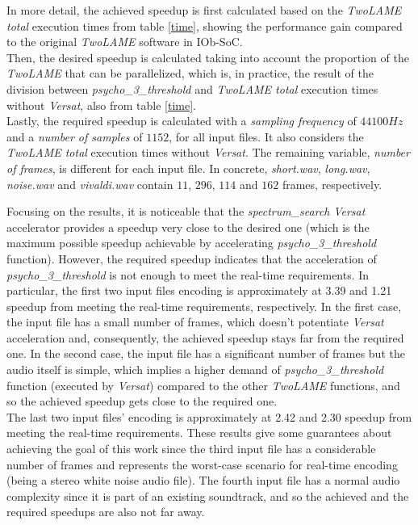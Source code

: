 
In more detail, the achieved speedup is first calculated based on the \textit{TwoLAME total} execution times from table \ref{time}, showing the performance gain compared to the original \textit{TwoLAME} software in IOb-SoC.\\
Then, the desired speedup is calculated taking into account the proportion of the \textit{TwoLAME} that can be parallelized, which is, in practice, the result of the division between \textit{psycho\_3\_threshold} and \textit{TwoLAME total} execution times without \textit{Versat}, also from table \ref{time}. \\
Lastly, the required speedup is calculated with a \textit{sampling frequency} of $44100Hz$ and a \textit{number of samples} of $1152$, for all input files. It also considers the \textit{TwoLAME total} execution times without \textit{Versat}. The remaining variable, \textit{number of frames}, is different for each input file. In concrete, \textit{short.wav}, \textit{long.wav}, \textit{noise.wav} and \textit{vivaldi.wav} contain $11$, $296$, $114$ and $162$ frames, respectively.

Focusing on the results, it is noticeable that the \textit{spectrum\_search} \textit{Versat} accelerator provides a speedup very close to the desired one (which is the maximum possible speedup achievable by accelerating \textit{psycho\_3\_threshold} function).
However, the required speedup indicates that the acceleration of \textit{psycho\_3\_threshold} is not enough to meet the real-time requirements. 
In particular, the first two input files encoding is approximately at 3.39 and 1.21 speedup from meeting the real-time requirements, respectively. In the first case, the input file has a small number of frames, which doesn't potentiate \textit{Versat} acceleration and, consequently, the achieved speedup stays far from the required one.
In the second case, the input file has a significant number of frames but the audio itself is simple, which implies a higher demand of \textit{psycho\_3\_threshold} function (executed by \textit{Versat}) compared to the other \textit{TwoLAME} functions, and so the achieved speedup gets close to the required one. \\
The last two input files' encoding is approximately at 2.42 and 2.30 speedup from meeting the real-time requirements. These results give some guarantees about achieving the goal of this work since the third input file has a considerable number of frames and represents the worst-case scenario for real-time encoding (being a stereo white noise audio file). The fourth input file has a normal audio complexity since it is part of an existing soundtrack, and so the achieved and the required speedups are also not far away.

